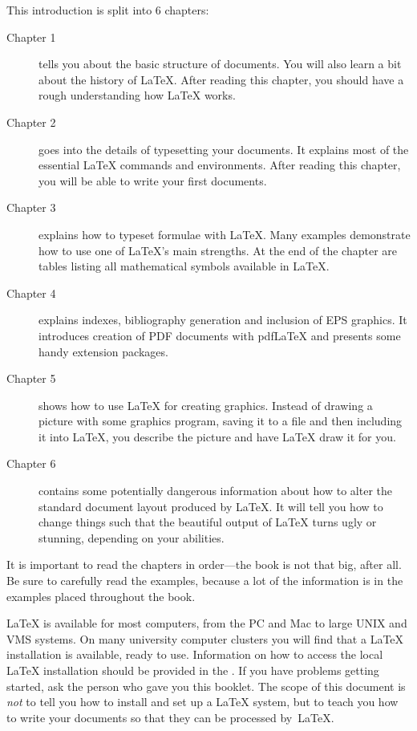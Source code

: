 \bigskip
\noindent This introduction is split into 6 chapters:
\begin{description}
\item[Chapter 1] tells you about the basic structure of \LaTeXe{}
  documents. You will also learn a bit about the history of \LaTeX{}.
  After reading this chapter, you should have a rough understanding how
  \LaTeX{} works.
\item[Chapter 2] goes into the details of typesetting your
  documents. It explains most of the essential \LaTeX{} commands and
  environments. After reading this chapter, you will be able to write
  your first documents. 
\item[Chapter 3] explains how to typeset formulae with \LaTeX. Many
  examples demonstrate how to use one of \LaTeX{}'s
  main strengths. At the end of the chapter are tables listing
  all mathematical symbols available in \LaTeX{}.
\item[Chapter 4] explains indexes,  bibliography generation and
  inclusion of EPS graphics. It introduces creation of PDF documents with pdf\LaTeX{}
  and presents some handy extension packages.
\item[Chapter 5] shows how to use \LaTeX{} for creating graphics. Instead
  of drawing a picture with some graphics program, saving it to a file and
  then including it into \LaTeX{}, you describe the picture and have \LaTeX{}
  draw it for you.
\item[Chapter 6] contains some potentially dangerous information about
  how to alter the
  standard document layout produced by \LaTeX{}. It will tell you how  to
  change things such that the beautiful output of \LaTeX{}
  turns ugly or stunning, depending on your abilities.
\end{description}
\bigskip
\noindent It is important to read the chapters in order---the book is
not that big, after all. Be sure to carefully read the examples,
because a lot of the information is in the
examples placed throughout the book.

\bigskip
\noindent \LaTeX{} is available for most computers, from the PC and Mac to large
UNIX and VMS systems. On many university computer clusters you will
find that a \LaTeX{} installation is available, ready to use.
Information on how to access
the local \LaTeX{} installation should be provided in the \guide. If
you have problems getting started, ask the person who gave you this
booklet. The scope of this document is \emph{not} to tell you how to
install and set up a \LaTeX{} system, but to teach you how to write
your documents so that they can be processed by~\LaTeX{}.

